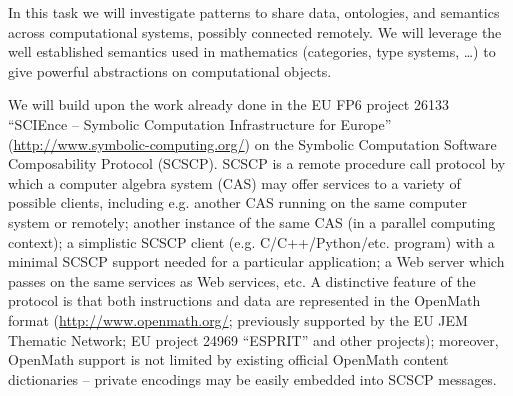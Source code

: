 \begin{workpackage}[id=component-architecture,wphases=0-48!.5,
  title=Component Architecture,lead=UV,
  PSRM=24,UVRM=8,SARM=16, USHRM=4, USORM=6]
\begin{tasklist}
\begin{task}[id=portability,title=Portability,lead=UV,PM=28]
  \end{task}

  \begin{task}[title=Interfaces between systems,id=interface-systems,lead=PS,PM=18]
    In this task we will investigate patterns to share data,
    ontologies, and semantics across computational systems, possibly
    connected remotely.  We will leverage the well established
    semantics used in mathematics (categories, type systems, \dots) to
    give powerful abstractions on computational objects.
    
    We will build upon the work already done in the EU FP6 project
    26133 ``SCIEnce -- Symbolic Computation Infrastructure for
    Europe'' (\url{http://www.symbolic-computing.org/}) on the Symbolic Computation
    Software Composability Protocol (SCSCP). SCSCP is a remote
    procedure call protocol by which a computer algebra system (CAS)
    may offer services to a variety of possible clients, including
    e.g.  another CAS running on the same computer system or remotely;
    another instance of the same CAS (in a parallel computing
    context); a simplistic SCSCP client
    (e.g. C/C++/Python/etc. program) with a minimal SCSCP support
    needed for a particular application; a Web server which passes on
    the same services as Web services, etc.  A distinctive feature of
    the protocol is that both instructions and data are represented in
    the OpenMath format (\url{http://www.openmath.org/}; previously
    supported by the EU JEM Thematic Network; EU project 24969
    ``ESPRIT'' and other projects); moreover, OpenMath support is not
    limited by existing official OpenMath content dictionaries --
    private encodings may be easily embedded into SCSCP messages.
    

\end{task}
\end{tasklist}
\end{workpackage}
